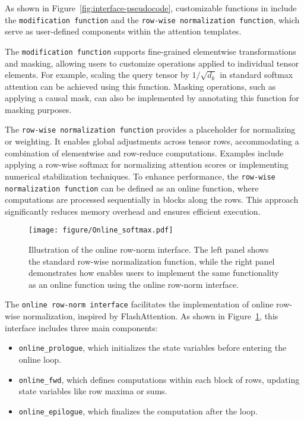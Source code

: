 \label{subsec:func}
As shown in Figure~\ref{fig:interface-pseudocode}, customizable functions in \oursys{} include the \texttt{modification function} and the \texttt{row-wise normalization function}, which serve as user-defined components within the attention templates.

The \texttt{modification function} supports fine-grained elementwise transformations and masking, allowing users to customize operations applied to individual tensor elements. For example, scaling the query tensor by $1/\sqrt{d_k}$ in standard softmax attention can be achieved using this function. Masking operations, such as applying a causal mask, can also be implemented by annotating this function for masking purposes.

The \texttt{row-wise normalization function} provides a placeholder for normalizing or weighting. It enables global adjustments across tensor rows, accommodating a combination of elementwise and row-reduce computations. Examples include applying a row-wise softmax for normalizing attention scores or implementing numerical stabilization techniques. To enhance performance, the \texttt{row-wise normalization function} can be defined as an online function, where computations are processed sequentially in blocks along the rows. This approach significantly reduces memory overhead and ensures efficient execution.

\begin{figure}[t]
    \centering
    \texttt{[image: figure/Online\_softmax.pdf]}
    \caption{Illustration of the online row-norm interface. The left panel shows the standard row-wise normalization function, while the right panel demonstrates how \oursys{} enables users to implement the same functionality as an online function using the online row-norm interface.}
  \vspace{-5mm}
    \label{fig:onlineFunc}
\end{figure}

The \texttt{online row-norm interface} facilitates the implementation of online row-wise normalization, inspired by FlashAttention\cite{dao2022flashattention}. As shown in Figure~\ref{fig:onlineFunc}, this interface includes three main components:
\begin{itemize}[noitemsep,topsep=0pt]
    \item \texttt{online\_prologue}, which initializes the state variables before entering the online loop.
    \item \texttt{online\_fwd}, which defines computations within each block of rows, updating state variables like row maxima or sums.
    \item \texttt{online\_epilogue}, which finalizes the computation after the loop.
\end{itemize}

